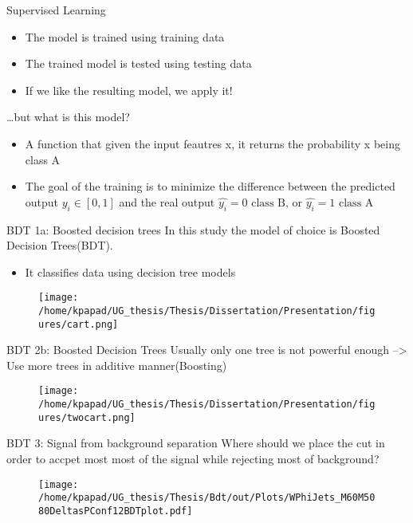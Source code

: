 \documentclass[bigger]{beamer}
\begin{document}
\begin{frame}[label={sec:orgc157cde}]{Supervised Learning}
\begin{itemize}
\item The model is trained using training data
\item The trained model is tested using testing data
\item If we like the resulting model, we apply it!\linebreak
\end{itemize}

\alert{\ldots{}but what is this model?}
\begin{itemize}
\item A function that given the input feautres x, it returns the probability x being class A
\item The goal of the training is to minimize the difference between the predicted output \(y_{i} \in [0, 1]\) and the real output \(\hat{y_{i}} = 0\text{ class B, or }\hat{y_{i}} = 1\text{ class A}\)
\end{itemize}
\end{frame}
\begin{frame}[label={sec:org72f55b7}]{BDT 1a: Boosted decision trees}
In this study the model of choice is Boosted Decision Trees(BDT).
\begin{itemize}
\item It classifies data using decision tree models
\end{itemize}
\begin{figure}[h]
\centering
\texttt{[image: /home/kpapad/UG\_thesis/Thesis/Dissertation/Presentation/figures/cart.png]}
\end{figure}
\end{frame}
\begin{frame}[label={sec:orge22b3dd}]{BDT 2b: Boosted Decision Trees}
Usually only one tree is not powerful enough --> Use  more trees in additive manner(Boosting)
\begin{figure}[h]
\centering
\texttt{[image: /home/kpapad/UG\_thesis/Thesis/Dissertation/Presentation/figures/twocart.png]}
\end{figure}
\end{frame}
\begin{frame}[label={sec:orga03c000}]{BDT 3: Signal from background separation}
Where should we place the cut in order to accpet most most of the  signal while rejecting most of background?
\begin{figure}[hb]
\centering
\texttt{[image: /home/kpapad/UG\_thesis/Thesis/Bdt/out/Plots/WPhiJets\_M60M5080DeltasPConf12BDTplot.pdf]}
\end{figure}
\end{frame}
\end{document}
